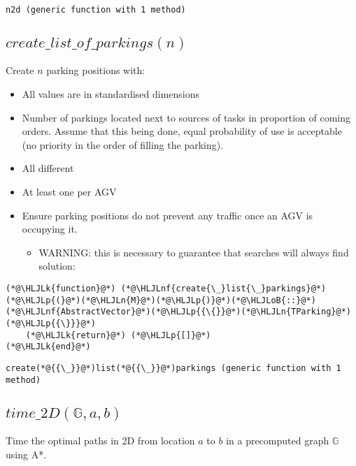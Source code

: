 \documentclass[12pt,a4paper]{article}
\newcommand{\HLJLk}[1]{\textcolor[RGB]{148,91,176}{\textbf{#1}}}
\newcommand{\HLJLn}[1]{#1}
\newcommand{\HLJLnf}[1]{\textcolor[RGB]{66,102,213}{#1}}
\newcommand{\HLJLoB}[1]{\textcolor[RGB]{102,102,102}{\textbf{#1}}}
\newcommand{\HLJLp}[1]{#1}
\begin{document}
\begin{lstlisting}
n2d (generic function with 1 method)
\end{lstlisting}


\subsection{$create\_list\_of\_parkings(n)$}
Create $n$ parking positions with:

\begin{itemize}
\item All values are in standardised dimensions


\item Number of parkings located next to sources of tasks in proportion of coming orders. Assume that this being done, equal probability of use is acceptable (no priority in the order of filling the parking).


\item All different


\item At least one per AGV


\item Ensure parking positions do not prevent any traffic once an AGV is occupying it.

\begin{itemize}
\item WARNING: this is necessary to guarantee that searches will always find solution:

\end{itemize}
\end{itemize}

\begin{lstlisting}
(*@\HLJLk{function}@*) (*@\HLJLnf{create{\_}list{\_}parkings}@*)(*@\HLJLp{(}@*)(*@\HLJLn{M}@*)(*@\HLJLp{)}@*)(*@\HLJLoB{::}@*)(*@\HLJLnf{AbstractVector}@*)(*@\HLJLp{{\{}}@*)(*@\HLJLn{TParking}@*)(*@\HLJLp{{\}}}@*)
    (*@\HLJLk{return}@*) (*@\HLJLp{[]}@*)
(*@\HLJLk{end}@*)
\end{lstlisting}

\begin{lstlisting}
create(*@{{\_}}@*)list(*@{{\_}}@*)parkings (generic function with 1 method)
\end{lstlisting}


\subsection{$time\_2D(\mathbb{G}, a, b)$}
Time the optimal paths in 2D from location $a$ to $b$ in a precomputed graph $\mathbb{G}$ using A*.
\end{document}
